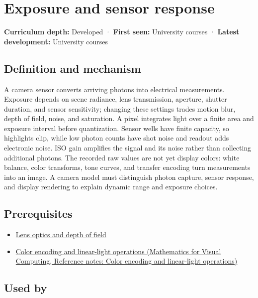 \hypertarget{appendix-92d45cdf2afc}{}\label{referencestart:appendix-92d45cdf2afc}
\section{Exposure and sensor response}\label{appendix-92d45cdf2afc-exposure-and-sensor-response}

\textbf{Curriculum depth:} Developed · \textbf{First seen:} University courses · \textbf{Latest development:} University courses

\subsection{Definition and mechanism}\label{appendix-92d45cdf2afc-definition-and-mechanism}

A camera sensor converts arriving photons into electrical measurements. Exposure depends on scene radiance, lens transmission, aperture, shutter duration, and sensor sensitivity; changing these settings trades motion blur, depth of field, noise, and saturation. A pixel integrates light over a finite area and exposure interval before quantization. Sensor wells have finite capacity, so highlights clip, while low photon counts have shot noise and readout adds electronic noise. ISO gain amplifies the signal and its noise rather than collecting additional photons. The recorded raw values are not yet display colors: white balance, color transforms, tone curves, and transfer encoding turn measurements into an image. A camera model must distinguish photon capture, sensor response, and display rendering to explain dynamic range and exposure choices.

\subsection{Prerequisites}\label{appendix-92d45cdf2afc-prerequisites}

\begin{itemize}
\tightlist
\item
  \hyperref[appendix-21f8456e2629]{Lens optics and depth of field}
\item
  \href{../02-Mathematics-for-Visual-Computing/main.pdf\#nameddest=appendix-a9f83ad40792}{Color encoding and linear-light operations (Mathematics for Visual Computing, Reference notes: Color encoding and linear-light operations)}
\end{itemize}

\subsection{Used by}\label{appendix-92d45cdf2afc-used-by}

